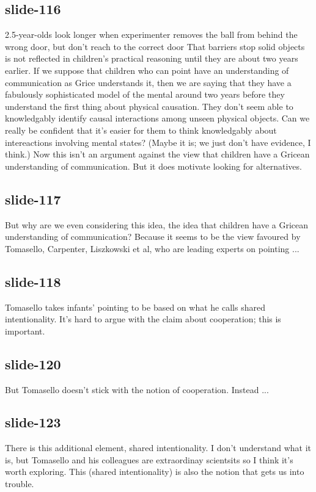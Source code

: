 \documentclass[12pt,\papersize]{extarticle}
\begin{document}
 
\subsection{slide-116}
2.5-year-olds look longer when experimenter removes the ball from behind the wrong door, but don't reach to the correct door
That barriers stop solid objects is not reflected in children's practical reasoning until they are about two years earlier.
If we suppose that children who can point have an understanding of communication as Grice understands it, then we are saying that they have a fabulously sophisticated model of the mental around two years before they understand the first thing about physical causation. They don't seem able to knowledgably identify causal interactions among unseen physical objects. Can we really be confident that it's easier for them to think knowledgably about intereactions involving mental states? (Maybe it is; we just don't have evidence, I think.)
Now this isn't an argument against the view that children have a Gricean understanding of communication.
But it does motivate looking for alternatives.
 
 
\subsection{slide-117}
But why are we even considering this idea, the idea that children have a Gricean understanding of communication?
Because it seems to be the view favoured by Tomasello, Carpenter, Liszkowski et al, who are leading experts on pointing ...
 
 
\subsection{slide-118}
Tomasello takes infants' pointing to be based on what he calls shared intentionality.
It's hard to argue with the claim about cooperation; this is important.
 
 
\subsection{slide-120}
But Tomasello doesn't stick with the notion of cooperation. Instead ...
 
 
\subsection{slide-123}
There is this additional element, shared intentionality. I don't understand what it is, but Tomasello and his colleagues are extraordinay scientsits so I think it's worth exploring.
This (shared intentionality) is also the notion that gets us into trouble.
 
\end{document}
